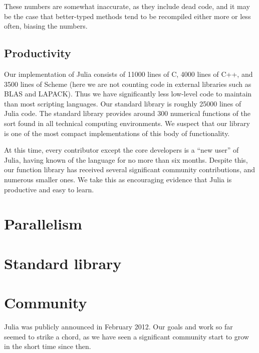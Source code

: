 \documentclass[9pt]{sigplanconf}
\begin{document}
These numbers are somewhat inaccurate, as they include dead code, and
it may be the case that better-typed methods tend to be recompiled either
more or less often, biasing the numbers.


\subsection{Productivity}

Our implementation of Julia consists of 11000 lines of C, 4000 lines
of C++, and 3500 lines of Scheme (here we are not counting code in
external libraries such as BLAS and LAPACK).  Thus we have
significantly less low-level code to maintain than most scripting
languages.  Our standard library is roughly 25000 lines of Julia code.
The standard library provides around 300 numerical functions of the
sort found in all technical computing environments. We suspect that
our library is one of the most compact implementations of this body of
functionality.

At this time, every contributor except the core developers is a ``new
user'' of Julia, having known of the language for no more than six
months.  Despite this, our function library has received several
significant community contributions, and numerous smaller ones. We
take this as encouraging evidence that Julia is productive and easy to
learn.


\section{Parallelism}


\section{Standard library}

\section{Community}

Julia was publicly announced in February 2012. Our goals and work so
far seemed to strike a chord, as we have seen a significant community
start to grow in the short time since then.
\end{document}
